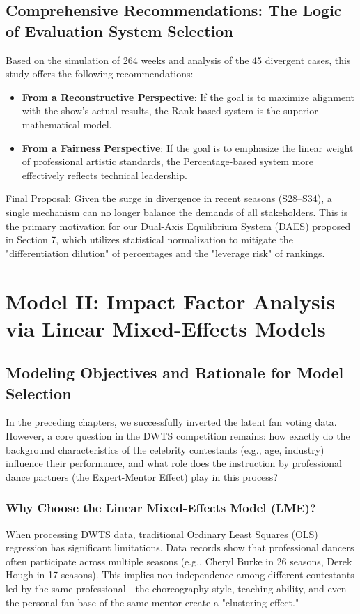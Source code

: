 \documentclass[12pt]{article}
\begin{document}
	
	\subsection{Comprehensive Recommendations: The Logic of Evaluation System Selection}
	Based on the simulation of 264 weeks and analysis of the 45 divergent cases, this study offers the following recommendations:
	\begin{itemize}
		\item \textbf{From a Reconstructive Perspective}: If the goal is to maximize alignment with the show's actual results, the Rank-based system is the superior mathematical model.
		\item \textbf{From a Fairness Perspective}: If the goal is to emphasize the linear weight of professional artistic standards, the Percentage-based system more effectively reflects technical leadership.
	\end{itemize}
	Final Proposal: Given the surge in divergence in recent seasons (S28–S34), a single mechanism can no longer balance the demands of all stakeholders. This is the primary motivation for our Dual-Axis Equilibrium System (DAES) proposed in Section 7, which utilizes statistical normalization to mitigate the "differentiation dilution" of percentages and the "leverage risk" of rankings.
	
	\section{Model II: Impact Factor Analysis via Linear Mixed-Effects Models}
	\subsection{Modeling Objectives and Rationale for Model Selection}
	In the preceding chapters, we successfully inverted the latent fan voting data. However, a core question in the DWTS competition remains: how exactly do the background characteristics of the celebrity contestants (e.g., age, industry) influence their performance, and what role does the instruction by professional dance partners (the Expert-Mentor Effect) play in this process?
	
	\subsubsection{Why Choose the Linear Mixed-Effects Model (LME)?}
	When processing DWTS data, traditional Ordinary Least Squares (OLS) regression has significant limitations. Data records show that professional dancers often participate across multiple seasons (e.g., Cheryl Burke in 26 seasons, Derek Hough in 17 seasons). This implies non-independence among different contestants led by the same professional—the choreography style, teaching ability, and even the personal fan base of the same mentor create a "clustering effect."
	
\end{document}
